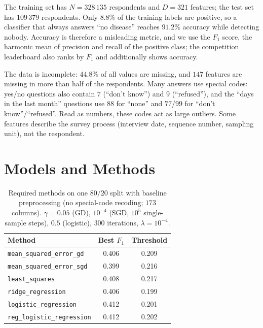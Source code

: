 \documentclass[10pt,conference,compsocconf]{IEEEtran}
\begin{document}
The training set has $N=328\,135$ respondents and $D=321$ features;
the test set has $109\,379$ respondents. Only $8.8\%$ of the training
labels are positive, so a classifier that always answers ``no disease''
reaches $91.2\%$ accuracy while detecting nobody. Accuracy is
therefore a misleading metric, and we use the $F_1$ score, the
harmonic mean of precision and recall of the positive class; the
competition leaderboard also ranks by $F_1$ and additionally shows
accuracy.

The data is incomplete: $44.8\%$ of all values are missing, and $147$
features are missing in more than half of the respondents. Many answers
use special codes: yes/no questions also contain $7$ (``don't know'')
and $9$ (``refused''), and the ``days in the last month'' questions use
$88$ for ``none'' and $77$/$99$ for ``don't know''/``refused''. Read as
numbers, these codes act as large outliers. Some features describe the
survey process (interview date, sequence number, sampling unit), not
the respondent.

\section{Models and Methods}
\label{sec:methods}

\begin{table}[htbp]
  \centering
  \footnotesize
  \caption{Required methods on one $80/20$ split with baseline
  preprocessing (no special-code recoding; $173$ columns).
  $\gamma=0.05$ (GD), $10^{-4}$ (SGD, $10^5$ single-sample steps),
  $0.5$ (logistic), $300$ iterations, $\lambda=10^{-4}$.}
  \label{tab:methods}
  \begin{tabular}{|l|c|c|}
    \hline
    Method & Best $F_1$ & Threshold\\
    \hline
    \texttt{mean\_squared\_error\_gd} & 0.406 & 0.209\\
    \texttt{mean\_squared\_error\_sgd} & 0.399 & 0.216\\
    \texttt{least\_squares} & 0.408 & 0.217\\
    \texttt{ridge\_regression} & 0.406 & 0.199\\
    \texttt{logistic\_regression} & 0.412 & 0.201\\
    \texttt{reg\_logistic\_regression} & 0.412 & 0.202\\
    \hline
  \end{tabular}
\end{table}
\end{document}

